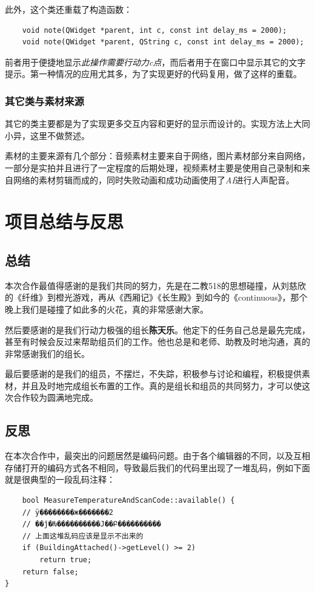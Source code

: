 \documentclass[hyperref,a4paper,UTF8]{ctexart}
\begin{document}
此外，这个类还重载了构造函数：

\begin{verbatim}
    void note(QWidget *parent, int c, const int delay_ms = 2000);
    void note(QWidget *parent, QString c, const int delay_ms = 2000);
\end{verbatim}

前者用于便捷地显示\textit{此操作需要行动力c点}，而后者用于在窗口中显示其它的文字提示。第一种情况的应用尤其多，为了实现更好的代码复用，做了这样的重载。

\subsubsection{其它类与素材来源}

其它的类主要都是为了实现更多交互内容和更好的显示而设计的。实现方法上大同小异，这里不做赘述。

素材的主要来源有几个部分：音频素材主要来自于网络，图片素材部分来自网络，一部分是实拍并且进行了一定程度的后期处理，视频素材主要是使用自己录制和来自网络的素材剪辑而成的，同时失败动画和成功动画使用了\textit{AI}进行人声配音。


\section{项目总结与反思}
\subsection{总结}
本次合作最值得感谢的是我们共同的努力，先是在二教518的思想碰撞，从刘慈欣的《纤维》到橙光游戏，再从《西厢记》《长生殿》到如今的《continuous》，那个晚上我们是碰撞了如此多的火花，真的非常感谢大家。

然后要感谢的是我们行动力极强的组长\textbf{陈天乐}。他定下的任务自己总是最先完成，甚至有时候会反过来帮助组员们的工作。他也总是和老师、助教及时地沟通，真的非常感谢我们的组长。

最后要感谢的是我们的组员，不摆烂，不失踪，积极参与讨论和编程，积极提供素材，并且及时地完成组长布置的工作。真的是组长和组员的共同努力，才可以使这次合作较为圆满地完成。



\subsection{反思}
在本次合作中，最突出的问题居然是编码问题。由于各个编辑器的不同，以及互相存储打开的编码方式各不相同，导致最后我们的代码里出现了一堆乱码，例如下面就是很典型的一段乱码注释：
\begin{verbatim}
    bool MeasureTemperatureAndScanCode::available() {
    // ÿ��������ж�������2
    // ��ǰ�Ƕ����������Ϳ��Բ����������
    // 上面这堆乱码应该是显示不出来的
    if (BuildingAttached()->getLevel() >= 2)
        return true;
    return false;
}
\end{verbatim}
\end{document}
